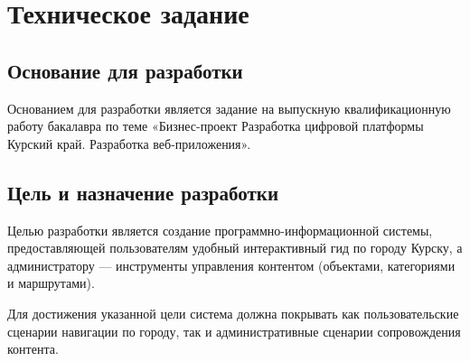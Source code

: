 \section{Техническое задание}

\subsection{Основание для разработки}
Основанием для разработки является задание на выпускную квалификационную работу бакалавра по теме «Бизнес-проект \textquotedbl Разработка цифровой платформы Курский край\textquotedbl . Разработка веб-приложения».

\subsection{Цель и назначение разработки}
Целью разработки является создание программно-информационной системы, предоставляющей пользователям удобный интерактивный гид по городу Курску, а администратору --- инструменты управления контентом (объектами, категориями и маршрутами).

Для достижения указанной цели система должна покрывать как пользовательские сценарии навигации по городу, так и административные сценарии сопровождения контента.

